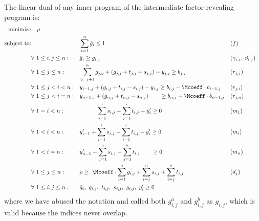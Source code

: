 \begin{definition}\label{def:intermediate-dual}
    The linear dual of any inner program of the intermediate factor-revealing program is:
    \begin{equation}\label{eq:direct-dual-lp}
        \begin{aligned}
        \text{minimize}& \quad \rho \\
        \text{subject to:}& 
            &&  \sum_{i=1}^{n} \hat{g}_i \leq 1 && \text{($f$)} \\
            & \forall \ 1 \le i, j \le n: 
            && \hat{g}_i \geq g_{i,j} && \text{($\gamma_{i,j}$, $\beta_{i,j}$)}\\
            & \forall \ 1\le j \le n: 
            && \sum_{q=j+1}^n g_{j,q} + \left(g_{j,j} + t_{j,j} - s_{j,j} \right) - y_{j,j} \geq b_{j,j}
            && \text{($r_{j,j}$)}\\
            & \forall \ 1\le j < i < n: 
            && y_{i-1,j} + \left(g_{i,j} + t_{i,j} - s_{i,j}\right) - y_{i,j} \geq b_{i,j} - \Mcoeff \cdot b_{i-1,j}
            && \text{($r_{j,i}$)}\\
            & \forall \ 1\le j < i = n: 
            && y_{n-1,j} + \left(g_{n,j} + t_{n,j} - s_{n,j}\right) \quad \ \ \ \geq b_{n,j} - \Mcoeff \cdot b_{n-1,j}
            && \text{($r_{j,n}$)}\\
            & \forall \ 1= i < n: 
            && \ \ \ \qquad \sum_{j=1}^i s_{i,j} - \sum_{j=1}^i t_{i,j} - y_i' \ge 0 && \text{($m_1$)}\\
            & \forall \ 1< i < n: 
            && y_{i-1}' + \sum_{j=1}^i s_{i,j} - \sum_{j=1}^i t_{i,j} - y_i'\ge 0 && \text{($m_i$)}\\
            & \forall \ 1< i = n: 
            && y_{n-1}' + \sum_{j=1}^n s_{i,j} - \sum_{j=1}^n t_{i,j} \qquad \ge 0 && \text{($m_n$)}\\
            & \forall \ 1\leq j\leq n:
            && \rho \geq \ \Mcoeff\cdot \sum_{i=1}^n g_{i,j} + \sum_{i=j}^n s_{i,j} + \sum_{i=j}^n t_{i,j} && \text{($d_j$)} \\
            & \forall \ 1 \le i,j \le n: && \hat{g}_{i}, \ g_{i,j}, \ t_{i,j}, \ s_{i,j}, \ y_{i,j},\ y_i' \geq 0
        \end{aligned}
    \end{equation}
    where we have abused the notation and called both $g_{i,j}^a$ and $g_{i,j}^b$ as $g_{i,j}$, which is valid because the indices never overlap.
\end{definition}

